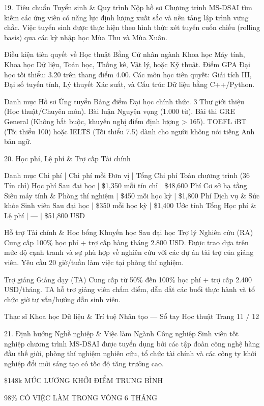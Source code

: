 19. Tiêu chuẩn Tuyển sinh \& Quy trình Nộp hồ sơ
Chương trình MS-DSAI tìm kiếm các ứng viên có năng lực định lượng xuất sắc và nền tảng lập trình vững chắc. Việc tuyển sinh được thực hiện theo hình thức xét tuyển cuốn chiếu (rolling basis) qua các kỳ nhập học Mùa Thu và Mùa Xuân.

Điều kiện tiên quyết về Học thuật
Bằng Cử nhân ngành Khoa học Máy tính, Khoa học Dữ liệu, Toán học, Thống kê, Vật lý, hoặc Kỹ thuật.
Điểm GPA Đại học tối thiểu: 3.20 trên thang điểm 4.00.
Các môn học tiên quyết: Giải tích III, Đại số tuyến tính, Lý thuyết Xác suất, và Cấu trúc Dữ liệu bằng C++/Python.

Danh mục Hồ sơ Ứng tuyển
Bảng điểm Đại học chính thức.
3 Thư giới thiệu (Học thuật/Chuyên môn).
Bài luận Nguyện vọng (1.000 từ).
Bài thi GRE General (Không bắt buộc, khuyến nghị điểm định lượng > 165).
TOEFL iBT (Tối thiểu 100) hoặc IELTS (Tối thiểu 7.5) dành cho người không nói tiếng Anh bản ngữ.

20. Học phí, Lệ phí \& Trợ cấp Tài chính

Danh mục Chi phí | Chi phí mỗi Đơn vị | Tổng Chi phí Toàn chương trình (36 Tín chỉ)
Học phí Sau đại học | \$1,350 mỗi tín chỉ | \$48,600
Phí Cơ sở hạ tầng Siêu máy tính \& Phòng thí nghiệm | \$450 mỗi học kỳ | \$1,800
Phí Dịch vụ \& Sức khỏe Sinh viên Sau đại học | \$350 mỗi học kỳ | \$1,400
Ước tính Tổng Học phí \& Lệ phí | — | \$51,800 USD

Hỗ trợ Tài chính \& Học bổng Khuyến học Sau đại học
Trợ lý Nghiên cứu (RA)
Cung cấp 100\% học phí + trợ cấp hàng tháng 2.800 USD. Được trao dựa trên mức độ cạnh tranh và sự phù hợp về nghiên cứu với các dự án tài trợ của giảng viên. Yêu cầu 20 giờ/tuần làm việc tại phòng thí nghiệm.

Trợ giảng Giảng dạy (TA)
Cung cấp từ 50\% đến 100\% học phí + trợ cấp 2.400 USD/tháng. TA hỗ trợ giảng viên chấm điểm, dẫn dắt các buổi thực hành và tổ chức giờ tư vấn/hướng dẫn sinh viên.

Thạc sĩ Khoa học Dữ liệu \& Trí tuệ Nhân tạo — Sổ tay Học thuật
Trang 11 / 12

21. Định hướng Nghề nghiệp \& Việc làm Ngành Công nghiệp
Sinh viên tốt nghiệp chương trình MS-DSAI được tuyển dụng bởi các tập đoàn công nghệ hàng đầu thế giới, phòng thí nghiệm nghiên cứu, tổ chức tài chính và các công ty khởi nghiệp đổi mới sáng tạo có tốc độ tăng trưởng cao.

\$148k
MỨC LƯƠNG KHỞI ĐIỂM TRUNG BÌNH

98\%
CÓ VIỆC LÀM TRONG VÒNG 6 THÁNG

